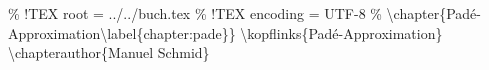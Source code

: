 \% !TEX root = ../../buch.tex \% !TEX encoding = UTF-8 \%
\textbackslash chapter\{Padé-Approximation\textbackslash label\{chapter:pade\}\}
\textbackslash kopflinks\{Padé-Approximation\}
\textbackslash chapterauthor\{Manuel Schmid\}
